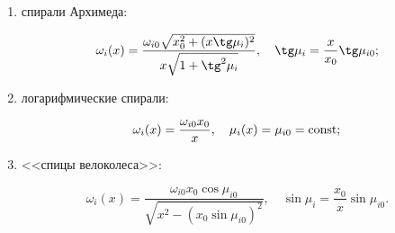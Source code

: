 \begin{enumerate}



\item[а)] спирали Архимеда: %

\begin{equation}

\label{rom1}

\omega_i(x)=\frac{\omega_{i0}\sqrt{x_0^2+(x\tg\mu_i)^2}}{x\sqrt{1+\tg^2\mu_i}}, \quad \tg\mu_i=\frac x{x_0}\tg\mu_{i0};

\end{equation}





\item[б)] логарифмические спирали: %

\begin{equation}

\label{rom2}

\omega_i(x)= \frac {\omega_{i0}x_0}x,\quad \mu_i(x)=\mu_{i0}={\rm const};

\end{equation}





\item[в)] <<спицы велоколеса>>: %

\begin{equation}

\label{rom3}

\omega_i(x)=\frac{\omega_{i0}x_0\cos\mu_{i0}}{\sqrt{x^2-(x_0\sin\mu_{i0})^2}},\quad \sin\mu_i=\frac {x_0}x \sin\mu_{i0}.

\end{equation}





\end{enumerate}





